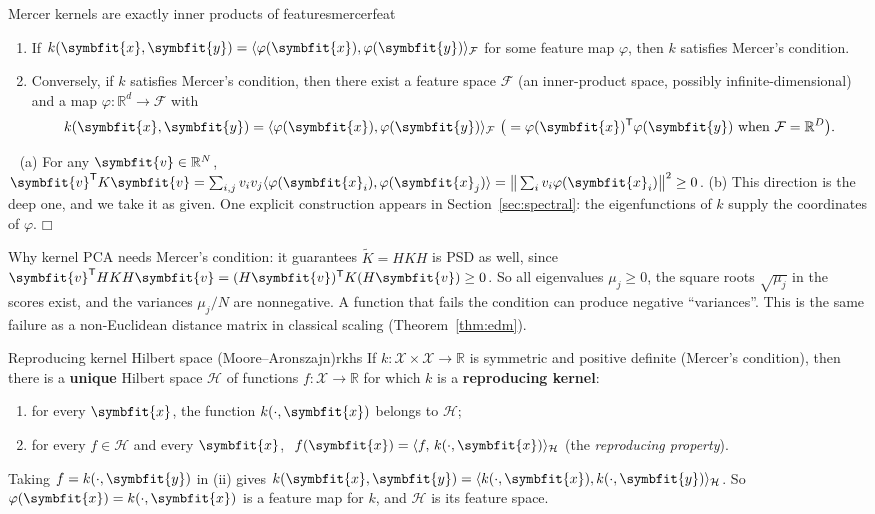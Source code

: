 \documentclass[11pt]{article}
\newcommand{\bm}[1]{\symbfit{#1}}
\newenvironment{proofsketch}{\par\noindent{\itshape Proof.}\ }{\hfill$\mdlgwhtsquare$\par}
\newcommand{\R}{\mathbb{R}}
\newcommand{\vx}{\bm{x}}
\newcommand{\vy}{\bm{y}}
\newcommand{\T}{^{\mathsf T}}
\begin{document}
\begin{theorem}{Mercer kernels are exactly inner products of features}{mercerfeat}
\begin{enumerate}[nosep,label=(\alph*)]
\item If $k(\vx,\vy)=\langle\varphi(\vx),\varphi(\vy)\rangle_{\mathcal F}$ for some feature map $\varphi$, then $k$ satisfies Mercer's condition.
\item Conversely, if $k$ satisfies Mercer's condition, then there exist a feature space $\mathcal F$ (an
inner-product space, possibly infinite-dimensional) and a map $\varphi:\R^d\to\mathcal F$ with
\[
k(\vx,\vy)=\langle\varphi(\vx),\varphi(\vy)\rangle_{\mathcal F}\ \big(=\varphi(\vx)\T\varphi(\vy)\ \text{when }\mathcal F=\R^D\big).
\]
\end{enumerate}
\end{theorem}
\begin{proofsketch}
(a) For any $\bm v\in\R^N$,
$\bm v\T K\bm v=\sum_{i,j}v_iv_j\langle\varphi(\vx_i),\varphi(\vx_j)\rangle=\big\|\sum_iv_i\varphi(\vx_i)\big\|^2\ge0$.
(b) This direction is the deep one, and we take it as given. One explicit construction
appears in Section~\ref{sec:spectral}: the eigenfunctions of $k$ supply the coordinates of
$\varphi$.
\end{proofsketch}

\begin{intuition}
Why kernel PCA needs Mercer's condition: it guarantees $\widetilde K=HKH$ is PSD as well, since
$\bm v\T HKH\bm v=(H\bm v)\T K(H\bm v)\ge0$. So all eigenvalues $\mu_j\ge0$, the square roots
$\sqrt{\mu_j}$ in the scores exist, and the variances $\mu_j/N$ are nonnegative. A function that
fails the condition can produce negative ``variances''. This is the same failure as a
non-Euclidean distance matrix in classical scaling (Theorem~\ref{thm:edm}).
\end{intuition}

\begin{theorem}{Reproducing kernel Hilbert space (Moore--Aronszajn)}{rkhs}
If $k:\mathcal X\times\mathcal X\to\R$ is symmetric and positive definite (Mercer's condition), then there is a
\textbf{unique} Hilbert space $\mathcal H$ of functions $f:\mathcal X\to\R$ for which $k$ is a \textbf{reproducing kernel}:
\begin{enumerate}[nosep,label=(\roman*)]
\item for every $\vx$, the function $k(\cdot,\vx)$ belongs to $\mathcal H$;
\item for every $f\in\mathcal H$ and every $\vx$, $\ f(\vx)=\langle f,\,k(\cdot,\vx)\rangle_{\mathcal H}$ (the \emph{reproducing property}).
\end{enumerate}
Taking $f=k(\cdot,\vy)$ in (ii) gives $k(\vx,\vy)=\langle k(\cdot,\vx),k(\cdot,\vy)\rangle_{\mathcal H}$. So
$\varphi(\vx)=k(\cdot,\vx)$ is a feature map for $k$, and $\mathcal H$ is its feature space.
\end{theorem}
\end{document}
